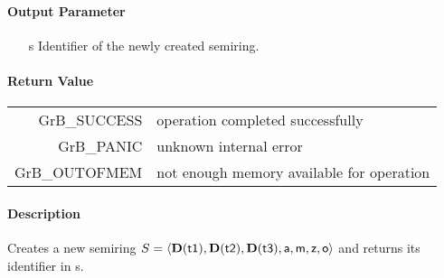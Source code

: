 \paragraph{Output Parameter}

\begin{itemize}
	\item[{\sf s}] Identifier of the newly created semiring.
\end{itemize}

\paragraph{Return Value}

\begin{tabular}{rl} 
{\sf GrB\_SUCCESS} 	& operation completed successfully \\
{\sf GrB\_PANIC}	& unknown internal error \\
{\sf GrB\_OUTOFMEM}	& not enough memory available for operation \\
\end{tabular}

\paragraph{Description}

Creates a new semiring $S = \langle \bold{D}({\sf t1}), \bold{D}({\sf t2}), \bold{D}({\sf t3}), {\sf a}, {\sf m}, {\sf z}, {\sf o} \rangle$ and
returns its identifier in {\sf s}.


